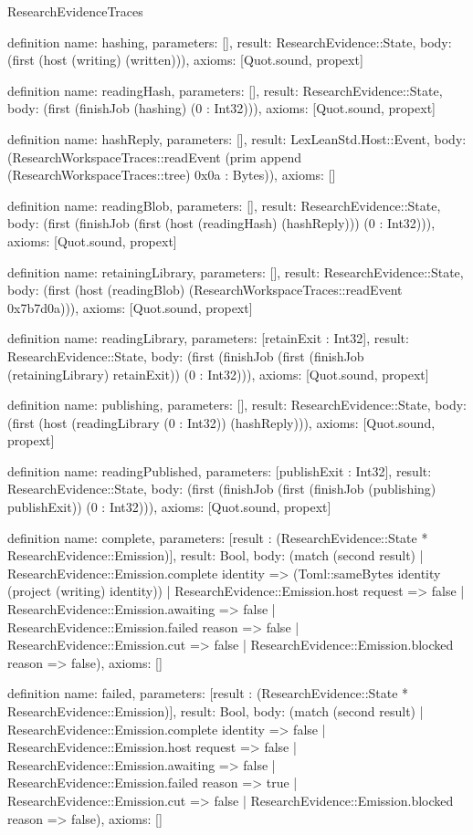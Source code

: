 \begin{lexlean}{ResearchEvidenceTraces}
\begin{semanticmodule}
definition{
 name: hashing,
 parameters: [],
 result: ResearchEvidence::State,
 body: (first (host (writing) (written))),
 axioms: [Quot.sound, propext]
}

definition{
 name: readingHash,
 parameters: [],
 result: ResearchEvidence::State,
 body: (first (finishJob (hashing) (0 : Int32))),
 axioms: [Quot.sound, propext]
}

definition{
 name: hashReply,
 parameters: [],
 result: LexLeanStd.Host::Event,
 body: (ResearchWorkspaceTraces::readEvent (prim append (ResearchWorkspaceTraces::tree) 0x0a : Bytes)),
 axioms: []
}

definition{
 name: readingBlob,
 parameters: [],
 result: ResearchEvidence::State,
 body: (first (finishJob (first (host (readingHash) (hashReply))) (0 : Int32))),
 axioms: [Quot.sound, propext]
}

definition{
 name: retainingLibrary,
 parameters: [],
 result: ResearchEvidence::State,
 body: (first (host (readingBlob) (ResearchWorkspaceTraces::readEvent 0x7b7d0a))),
 axioms: [Quot.sound, propext]
}

definition{
 name: readingLibrary,
 parameters: [retainExit : Int32],
 result: ResearchEvidence::State,
 body: (first (finishJob (first (finishJob (retainingLibrary) retainExit)) (0 : Int32))),
 axioms: [Quot.sound, propext]
}

definition{
 name: publishing,
 parameters: [],
 result: ResearchEvidence::State,
 body: (first (host (readingLibrary (0 : Int32)) (hashReply))),
 axioms: [Quot.sound, propext]
}

definition{
 name: readingPublished,
 parameters: [publishExit : Int32],
 result: ResearchEvidence::State,
 body: (first (finishJob (first (finishJob (publishing) publishExit)) (0 : Int32))),
 axioms: [Quot.sound, propext]
}

definition{
 name: complete,
 parameters: [result : (ResearchEvidence::State * ResearchEvidence::Emission)],
 result: Bool,
 body: (match (second result) | ResearchEvidence::Emission.complete identity => (Toml::sameBytes identity (project (writing) identity)) | ResearchEvidence::Emission.host request => false | ResearchEvidence::Emission.awaiting => false | ResearchEvidence::Emission.failed reason => false | ResearchEvidence::Emission.cut => false | ResearchEvidence::Emission.blocked reason => false),
 axioms: []
}

definition{
 name: failed,
 parameters: [result : (ResearchEvidence::State * ResearchEvidence::Emission)],
 result: Bool,
 body: (match (second result) | ResearchEvidence::Emission.complete identity => false | ResearchEvidence::Emission.host request => false | ResearchEvidence::Emission.awaiting => false | ResearchEvidence::Emission.failed reason => true | ResearchEvidence::Emission.cut => false | ResearchEvidence::Emission.blocked reason => false),
 axioms: []
}


\end{semanticmodule}
\end{lexlean}
